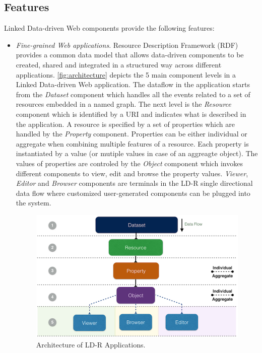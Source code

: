 \documentclass{acm_proc_article-sp}
\begin{document}
\subsection{Features}

Linked Data-driven Web components provide the following features:

\begin{itemize}

\item \emph{Fine-grained Web applications}.
Resource Description Framework (RDF) provides a common data model that allows data-driven components to be created, shared and integrated in a structured way across different applications. \autoref{fig:architecture} depicts the 5 main component levels in a Linked Data-driven Web application.
The dataflow in the application starts from the \emph{Dataset} component which handles all the events related to a set of resources embedded in a named graph.
The next level is the \emph{Resource} component which is identified by a URI and indicates what is described in the application.
A resource is specified by a set of properties which are handled by the \emph{Property} component. Properties can be either individual or aggregate when combining multiple features of a resource.
Each property is instantiated by a value (or mutiple values in case of an aggreagte object). 
The values of properties are controled by the \emph{Object} component which invokes different components to view, edit and browse the property values.
\emph{Viewer}, \emph{Editor} and \emph{Browser} components are terminals in the LD-R single directional data flow where customized user-generated components can be plugged into the system.

\begin{figure}[tb]
  \includegraphics[width=.9\linewidth]{images/architecture.jpg}
  \caption{Architecture of LD-R Applications.}
  \label{fig:architecture}
\end{figure}


\end{itemize}
\end{document}
